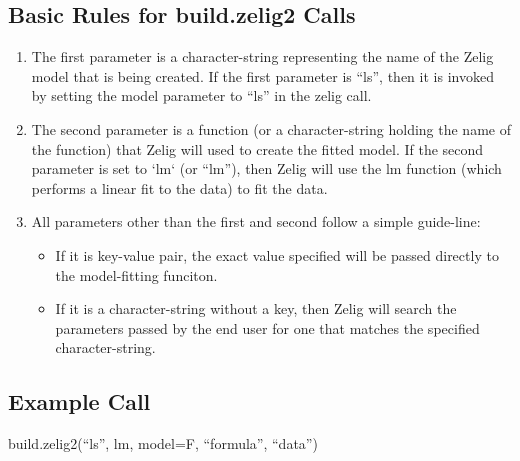 \subsection{Basic Rules for build.zelig2 Calls}
\begin{enumerate}
	\item{The first parameter is a character-string representing the name of the Zelig model that is being created.  If the first parameter is ``ls'', then it is invoked by setting the model parameter to ``ls'' in the zelig call.}
	\item{The second parameter is a function (or a character-string holding the name of the function) that Zelig will used to create the fitted model.  If the second parameter is set to `lm` (or ``lm''), then Zelig will use the lm function (which performs a linear fit to the data) to fit the data.}
	\item{All parameters other than the first and second follow a simple guide-line:
	\begin{itemize}
		\item{If it is key-value pair, the exact value specified will be passed directly to the model-fitting funciton.}
		\item{If it is a character-string without a key, then Zelig will search the parameters passed by the end user for one that matches the specified character-string.}
	\end{itemize}
	}
\end{enumerate}


\subsection{Example Call}
build.zelig2(``ls'', lm, model=F, ``formula'', ``data'')


